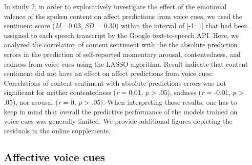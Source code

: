 \documentclass[
  english,
  man,floatsintext]{apa6}
\begin{document}
In study 2, in order to exploratively investigate the effect of the emotional valence of the spoken content on affect predictions from voice cues, we used the sentiment score (\emph{M} =0.03, \emph{SD} = 0.30) within the interval of {[}-1; 1{]} that had been assigned to each speech transcript by the Google text-to-speech API. Here, we analyzed the correlation of content sentiment with the the absolute prediction errors in the prediction of self-reported momentary arousal, contentedness, and sadness from voice cues using the LASSO algorithm. Result indicate that content sentiment did not have an effect on affect predictions from voice cues: Correlations of content sentiment with absolute predictions errors was not significant for neither contentedness (\emph{r} = 0.01, \emph{p} \textgreater{} .05), sadness (\emph{r} = -0.01, \emph{p} \textgreater{} .05), nor arousal (\emph{r} = 0, \emph{p} \textgreater{} .05). When interpreting those results, one has to keep in mind that overall the predictive performance of the models trained on voice cues was generally limited. We provide additional figures depicting the residuals in the online supplements.

\hypertarget{affective-voice-cues}{%
\subsection{Affective voice cues}\label{affective-voice-cues}}
\end{document}
